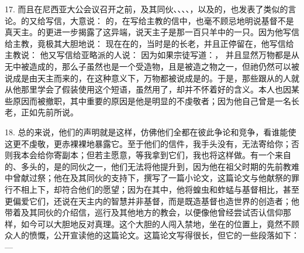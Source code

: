 17. 而且在尼西亚大公会议召开之前，及其同伙、、、、，以及的，也发表了类似的言论。的又给写信，大意说： 的，在写给主教的信中，也毫不顾忌地明说基督不是真天主。的更进一步揭露了这异端，说天主子是那一百只羊中的一只。因为他写信给主教，竟极其大胆地说： 现在在的，当时是的长老，并且正停留在，他写信给主教说： 他又写信给亚略派的人说： 因为如果宗徒写道：， 并且显然万物都是从无中被造成的，那么子虽然也是一个受造物，且是被造之物之一，但祂仍然可以被说成是由天主而来的，在这种意义下，万物都被说成是的。于是，那些跟从的人就从他那里学会了假装使用这个短语，虽然用了，却并不怀着好的含义。本人也因某些原因而被撤职，其中重要的原因是他是明显的不虔敬者；因为他自己曾是一名长老，正如先前所说。\par

18. 总的来说，他们的声明就是这样，仿佛他们全都在彼此争论和竞争，看谁能使这更不虔敬，更赤裸裸地暴露它。至于他们的信件，我手头没有，无法寄给你；否则我本会给你寄副本；但若主愿意，等我拿到它们，我也将这样做。有一个来自的、多头的，是的同伙之一，他们无法将他提升到，因为他在祖父时期的先前教难中曾献过祭；他在及其同伙的支持下，撰写了一篇小论文，这篇论文与他献祭的罪行不相上下，却符合他们的愿望；因为在其中，他将蝗虫和蚱蜢与基督相比，甚至更偏爱它们，还说在天主内的智慧并非基督，而是既造基督也造世界的创造者；他带着及其同伙的介绍信，巡行及其他地方的教会，以便像他曾经尝试否认信仰那样，如今可以大胆地反对真理。这个大胆的人闯入禁地，坐在的位置上，竟然不顾众人的愤慨，公开宣读他的这篇论文。这篇论文写得很长，但它的一些段落如下：—\par

